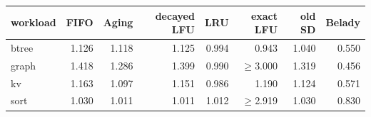 \begin{tabular}{lrrrrrrr}
\toprule
workload & FIFO & Aging & decayed LFU & LRU & exact LFU & old SD & Belady \\
\midrule
btree & 1.126 & 1.118 & 1.125 & 0.994 & 0.943 & 1.040 & 0.550 \\
graph & 1.418 & 1.286 & 1.399 & 0.990 & $\geq$3.000 & 1.319 & 0.456 \\
kv & 1.163 & 1.097 & 1.151 & 0.986 & 1.190 & 1.124 & 0.571 \\
sort & 1.030 & 1.011 & 1.011 & 1.012 & $\geq$2.919 & 1.030 & 0.830 \\
\bottomrule
\end{tabular}

